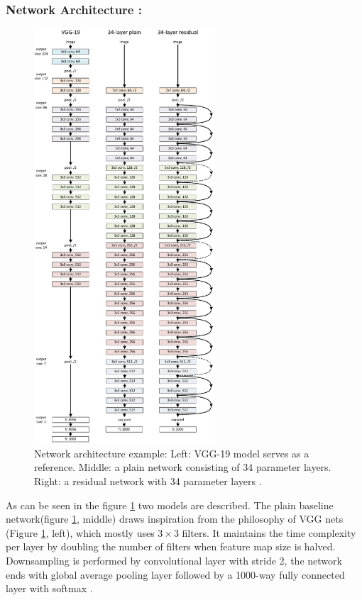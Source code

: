 \subsubsection*{Network Architecture :}

\begin{figure}[H]
    \centering
    \includegraphics[width=0.6\textwidth]{Rohit_Master_Thesis//Images/resnet_arch.pdf}
    \caption{Network architecture example: Left: VGG-19 model serves as a reference. Middle: a plain network consisting of 34 parameter layers. Right: a residual network with 34 parameter layers \cite{he2016deep}.}
    \label{fig:resnet architecture}
\end{figure}

As can be seen in the figure \ref{fig:resnet architecture} two models are described. The plain baseline network(figure \ref{fig:resnet architecture}, middle) draws inspiration from the philosophy of VGG nets\cite{simonyan2015deepconvolutionalnetworkslargescale} (Figure \ref{fig:resnet architecture}, left), which mostly uses $3\times3$ filters. It maintains the time complexity per layer by doubling the number of filters when feature map size is halved. Downsampling is performed by convolutional layer with stride 2, the network ends with global average pooling layer followed by a 1000-way fully connected layer with softmax \cite{he2016deep}.

